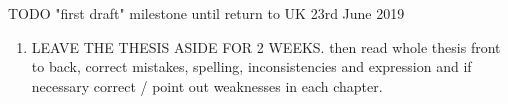 \documentclass[oneside]{book}
\begin{document}

\bigskip

TODO "first draft" milestone until return to UK 23rd June 2019
\begin{enumerate}
	\item LEAVE THE THESIS ASIDE FOR 2 WEEKS. then read whole thesis front to back, correct mistakes, spelling, inconsistencies and expression and if necessary correct / point out weaknesses in each chapter.
	
	
\end{enumerate}
\end{document}
